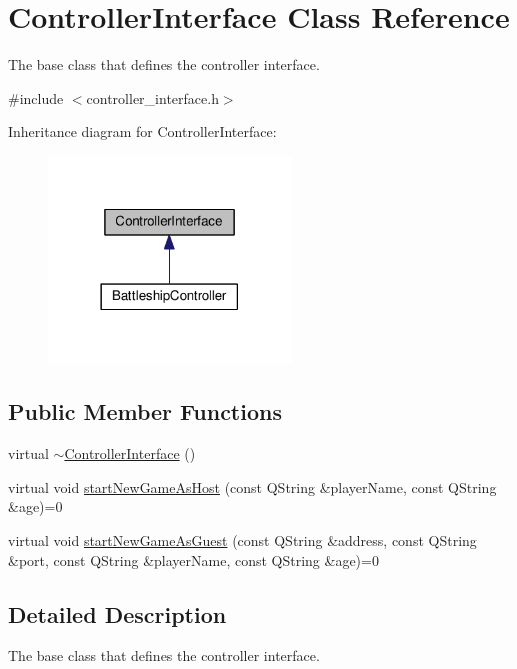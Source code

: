 \hypertarget{classControllerInterface}{}\section{Controller\+Interface Class Reference}
\label{classControllerInterface}


The base class that defines the controller interface.  




{\ttfamily \#include $<$controller\+\_\+interface.\+h$>$}



Inheritance diagram for Controller\+Interface\+:\nopagebreak
\begin{figure}[H]
\begin{center}
\leavevmode
\includegraphics[width=182pt]{classControllerInterface__inherit__graph}
\end{center}
\end{figure}
\subsection*{Public Member Functions}
\begin{DoxyCompactItemize}
\item 
virtual \hyperlink{classControllerInterface_a46df3c69ef790fee7dc8c58235dc689f}{$\sim$\+Controller\+Interface} ()
\item 
virtual void \hyperlink{classControllerInterface_a0a1077ca83efdd21ffe8b1c042eb9b3b}{start\+New\+Game\+As\+Host} (const Q\+String \&player\+Name, const Q\+String \&age)=0
\item 
virtual void \hyperlink{classControllerInterface_a59fe7601f2d7853043c7056d892b86a4}{start\+New\+Game\+As\+Guest} (const Q\+String \&address, const Q\+String \&port, const Q\+String \&player\+Name, const Q\+String \&age)=0
\end{DoxyCompactItemize}


\subsection{Detailed Description}
The base class that defines the controller interface. 

